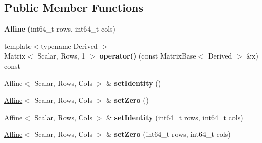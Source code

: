 \subsection*{Public Member Functions}
\begin{DoxyCompactItemize}
\item 
\hypertarget{struct_d_r_d_s_p_1_1_affine_a4015f697e1ed395aeb188ac68051854c}{{\bfseries Affine} (int64\-\_\-t rows, int64\-\_\-t cols)}\label{struct_d_r_d_s_p_1_1_affine_a4015f697e1ed395aeb188ac68051854c}

\item 
\hypertarget{struct_d_r_d_s_p_1_1_affine_a8796e5beff28d3bec5189ad9ba1a6771}{{\footnotesize template$<$typename Derived $>$ }\\Matrix$<$ Scalar, Rows, 1 $>$ {\bfseries operator()} (const Matrix\-Base$<$ Derived $>$ \&x) const }\label{struct_d_r_d_s_p_1_1_affine_a8796e5beff28d3bec5189ad9ba1a6771}

\item 
\hypertarget{struct_d_r_d_s_p_1_1_affine_a7b2b76f15a8625ae86b3e37544e556f5}{\hyperlink{struct_d_r_d_s_p_1_1_affine}{Affine}$<$ Scalar, Rows, Cols $>$ \& {\bfseries set\-Identity} ()}\label{struct_d_r_d_s_p_1_1_affine_a7b2b76f15a8625ae86b3e37544e556f5}

\item 
\hypertarget{struct_d_r_d_s_p_1_1_affine_abb5b868295c48b9199de2a399c330969}{\hyperlink{struct_d_r_d_s_p_1_1_affine}{Affine}$<$ Scalar, Rows, Cols $>$ \& {\bfseries set\-Zero} ()}\label{struct_d_r_d_s_p_1_1_affine_abb5b868295c48b9199de2a399c330969}

\item 
\hypertarget{struct_d_r_d_s_p_1_1_affine_a7554ebdba0ed98788a8b83cd6ff3f4e3}{\hyperlink{struct_d_r_d_s_p_1_1_affine}{Affine}$<$ Scalar, Rows, Cols $>$ \& {\bfseries set\-Identity} (int64\-\_\-t rows, int64\-\_\-t cols)}\label{struct_d_r_d_s_p_1_1_affine_a7554ebdba0ed98788a8b83cd6ff3f4e3}

\item 
\hypertarget{struct_d_r_d_s_p_1_1_affine_aef6aff937b07f9a443bf5410fbb014ce}{\hyperlink{struct_d_r_d_s_p_1_1_affine}{Affine}$<$ Scalar, Rows, Cols $>$ \& {\bfseries set\-Zero} (int64\-\_\-t rows, int64\-\_\-t cols)}\label{struct_d_r_d_s_p_1_1_affine_aef6aff937b07f9a443bf5410fbb014ce}

\end{DoxyCompactItemize}
